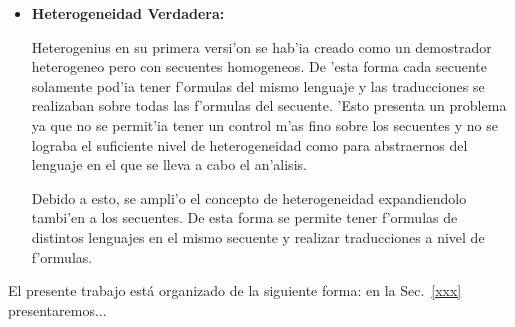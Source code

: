 \begin{itemize}
\item \textbf{Heterogeneidad Verdadera:}

Heterogenius en su primera versi'on se hab'ia creado como un demostrador heterogeneo pero con secuentes homogeneos. De 'esta forma cada secuente solamente pod'ia tener f'ormulas del mismo lenguaje y las traducciones se realizaban sobre todas las f'ormulas del secuente. 'Esto presenta un problema ya que no se permit'ia tener un control m'as fino sobre los secuentes y no se lograba el suficiente nivel de heterogeneidad como para abstraernos del lenguaje en el que se lleva a cabo el an'alisis.

Debido a esto, se ampli'o el concepto de heterogeneidad expandiendolo tambi'en a los secuentes. De esta forma se permite tener f'ormulas de distintos lenguajes en el mismo secuente y realizar traducciones a nivel de f'ormulas.

\end{itemize}

El presente trabajo está organizado de la siguiente forma: en la Sec.~\ref{xxx} presentaremos...